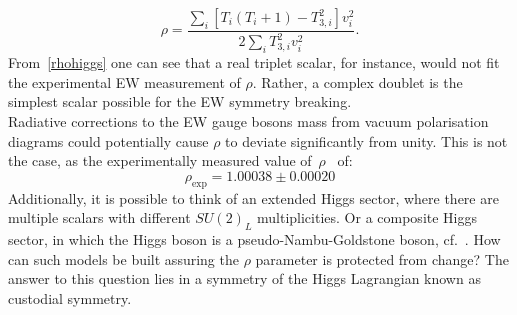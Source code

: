 \begin{equation}
	\rho =\frac{\sum_i [T_{i}(T_{i}+1)-T_{3,i}^2]v_i^2}{2\sum_i T_{3,i}^2v_i^2}.
	\label{rhohiggs}
\end{equation}
From~\eqref{rhohiggs} one can see that a real triplet scalar, for instance, would not fit the experimental EW measurement of $\rho$. Rather, a complex doublet is the simplest scalar possible for the EW symmetry breaking.\\ Radiative corrections to the EW gauge bosons mass from vacuum polarisation diagrams could potentially cause $\rho$ to deviate significantly from unity.  This is not the case, as the experimentally measured value of~$\rho$~\cite{Zyla:2020zbs} of:
\begin{equation}
	\rho_{\text{exp}} = 1.00038 \pm 0.00020
	\label{eq:rhoexp}
\end{equation}
Additionally, it is possible to think of an extended Higgs sector, where there are multiple scalars with different $SU(2)_L$ multiplicities. Or a composite Higgs sector, in which the Higgs boson is a pseudo-Nambu-Goldstone boson, cf.~\cite{Dugan1985AnatomyOA,Hill:2002ap}. How can such models be built assuring the $\rho$ parameter is protected from change? The answer to this question lies in a symmetry of the Higgs Lagrangian known as custodial symmetry. 
